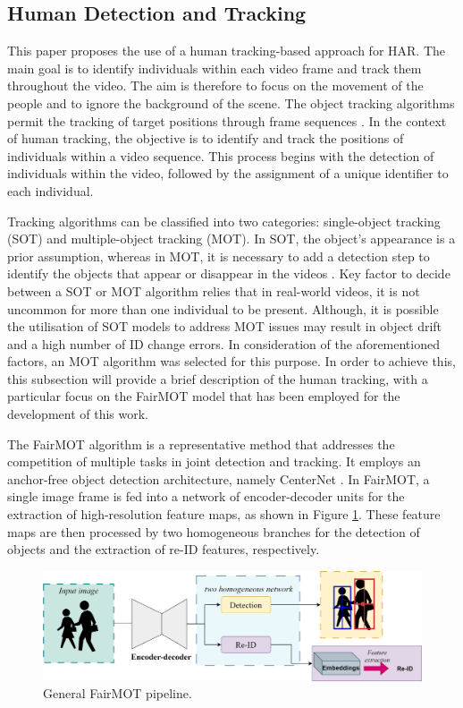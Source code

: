 \documentclass[mathematics,article,submit,pdftex,moreauthors]{Definitions/mdpi}
\begin{document}
\subsection{Human Detection and Tracking}
\label{sec:tracking}

This paper proposes the use of a human tracking-based approach for HAR. The main goal is to identify individuals within each video frame and track them throughout the video. The aim is therefore to focus on the movement of the people and to ignore the background of the scene. The object tracking algorithms permit the tracking of target positions through frame sequences \cite{CHEN2022103508}. In the context of human tracking, the objective is to identify and track the positions of individuals within a video sequence. This process begins with the detection of individuals within the video, followed by the assignment of a unique identifier to each individual.

Tracking algorithms can be classified into two categories: single-object tracking (SOT) and multiple-object tracking (MOT). In SOT, the object's appearance is a prior assumption, whereas in MOT, it is necessary to add a detection step to identify the objects that appear or disappear in the videos \cite{CHEN2022103508}. Key factor to decide between a SOT or MOT algorithm relies that in real-world videos, it is not uncommon for more than one individual to be present. Although, it is possible the utilisation of SOT models to address MOT issues may result in object drift and a high number of ID change errors. In consideration of the aforementioned factors, an MOT algorithm was selected for this purpose. In order to achieve this, this subsection will provide a brief description of the human tracking, with a particular focus on the FairMOT model that has been employed for the development of this work.

The FairMOT algorithm is a representative method that addresses the competition of multiple tasks in joint detection and tracking. It employs an anchor-free object detection architecture, namely CenterNet \cite{Duan_2019_ICCV}. In FairMOT, a single image frame is fed into a network of encoder-decoder units for the extraction of high-resolution feature maps, as shown in Figure \ref{fig:fairmot_pipeline}. These feature maps are then processed by two homogeneous branches for the detection of objects and the extraction of re-ID features, respectively.

\begin{figure}[H]
\includegraphics[width=13.7 cm]{Definitions/fairmot.png}
\caption{General FairMOT pipeline.\label{fig:fairmot_pipeline}}
\end{figure}  
\end{document}
